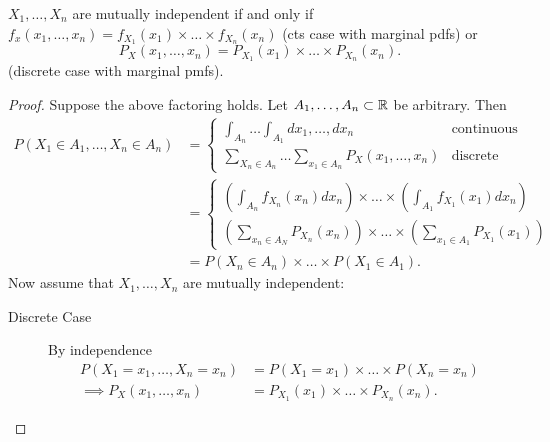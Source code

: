 \begin{theorem}
	$X_{1} , \ldots , X_{n}$ are mutually independent if and only if $f_{x}\left( x_{1} , \ldots , x_{n} \right) = f_{X_{1}}\left( x_1 \right) \times  \ldots\times f_{X_{n}}\left( x_{n} \right) $ (cts case with marginal pdfs) or 
	 \[
		 P_{X}\left( x_{1} , \ldots , x_{n} \right) = P_{X_{1}}\left( x_1 \right) \times \ldots\times P_{X_{n}}\left( x_{n} \right) 
	.\] 
	(discrete case with marginal pmfs).

\begin{proof}
	Suppose the above factoring holds. Let $A_{1} , \ldots , A_{n}\subset \mathbb{R}$ be arbitrary. Then
	\begin{align*}
		P\left( X_1 \in  A_1, \ldots, X_{n} \in  A_{n} \right) &= \begin{cases}
			\int_{A_{n}}^{ } \ldots \int_{A_1}^{ } dx_{1} , \ldots , dx_{n}  & \text{continuous} \\
			\sum_{X_{n} \in  A_{n}}^{ } \ldots \sum_{x_1 \in  A_{n}}^{ }  P_{X}\left( x_{1} , \ldots , x_{n} \right) & \text{discrete}
		\end{cases}\\
		&= \begin{cases}
			\left( \int_{A_{n}}^{ } f_{X_{n}}\left(x_{n}\right) dx_{n} \right) 	\times \ldots\times \left( \int_{A_{1}}^{ } f_{X_{1}}\left(x_{1}\right) dx_{n} \right) \\
			\left( \sum_{x_{n} \in  A_{N}}^{ } P_{X_{n}}\left( x_{n} \right)  \right) \times  \ldots \times \left( \sum_{x_1 \in  A_1}^{ } P_{X_1}\left( x_1 \right)  \right) 
		\end{cases} \\
		&= P\left( X_{n} \in  A_{n} \right) \times \ldots\times P\left( X_1 \in  A_1 \right) 
	.\end{align*}
	Now assume that $X_{1} , \ldots , X_{n}$ are mutually independent:
	\begin{description}
		\item[Discrete Case] By independence
			\begin{align*}
				P\left( X_{1} = x_1, \ldots, X_{n} = x_{n}\right) &= P\left( X_1 = x_1 \right) \times \ldots\times P\left( X_{n} = x_{n} \right)  \\
				\implies P_{X}\left( x_{1} , \ldots , x_{n} \right) &= P_{X_1}\left( x_1 \right) \times \ldots\times P_{X_{n}}\left( x_{n} \right) 
			.\end{align*}
	\end{description}
\end{proof}
\end{theorem}
